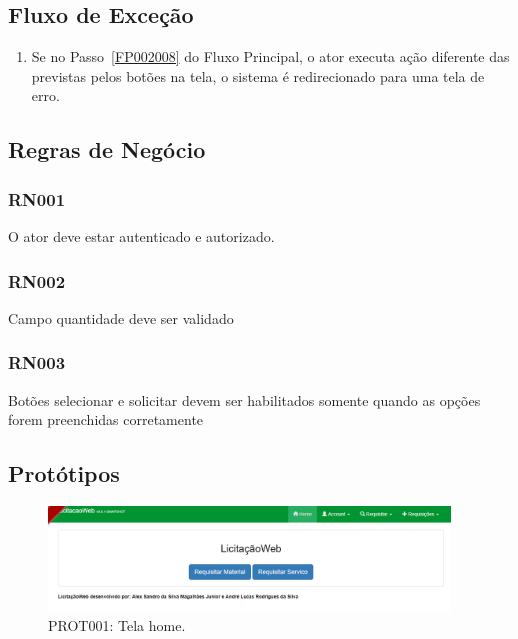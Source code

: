 \begin{anexosenv}
\subsection*{Fluxo de Exceção}
\begin{enumerate}
    \item Se no Passo~\ref{FP002008} do Fluxo Principal, o ator executa ação diferente das previstas pelos botões na tela, o sistema é redirecionado para uma tela de erro.
\end{enumerate}


\subsection*{Regras de Negócio}

\subsubsection*{RN001}\label{rn002}
O ator deve estar autenticado e autorizado.

\subsubsection*{RN002}\label{rn003}
Campo quantidade deve ser validado

\subsubsection*{RN003}\label{rn004}
Botões selecionar e solicitar devem ser habilitados somente quando as opções forem preenchidas corretamente

\subsection*{Protótipos}
\begin{figure}[htbp]
    \centering
    \includegraphics[width=0.95\textwidth]{figuras/prototipo001.png}
    \caption[PROT001: Tela home]{PROT001: Tela home.}
    \label{PROT001}
\end{figure}


\end{anexosenv}
